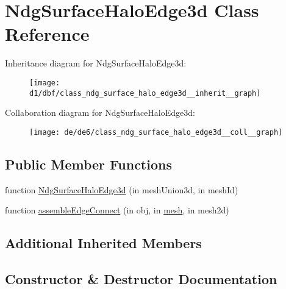 \hypertarget{class_ndg_surface_halo_edge3d}{}\section{Ndg\+Surface\+Halo\+Edge3d Class Reference}
\label{class_ndg_surface_halo_edge3d}


Inheritance diagram for Ndg\+Surface\+Halo\+Edge3d\+:
\nopagebreak
\begin{figure}[H]
\begin{center}
\leavevmode
\texttt{[image: d1/dbf/class\_ndg\_surface\_halo\_edge3d\_\_inherit\_\_graph]}
\end{center}
\end{figure}


Collaboration diagram for Ndg\+Surface\+Halo\+Edge3d\+:
\nopagebreak
\begin{figure}[H]
\begin{center}
\leavevmode
\texttt{[image: de/de6/class\_ndg\_surface\_halo\_edge3d\_\_coll\_\_graph]}
\end{center}
\end{figure}
\subsection*{Public Member Functions}
\begin{DoxyCompactItemize}
\item 
function \hyperlink{class_ndg_surface_halo_edge3d_a773d2b883ff27b786336fc5eae131855}{Ndg\+Surface\+Halo\+Edge3d} (in mesh\+Union3d, in mesh\+Id)
\item 
function \hyperlink{class_ndg_surface_halo_edge3d_afa3b659e3501ebafb4866cf33fc0bf92}{assemble\+Edge\+Connect} (in obj, in \hyperlink{class_ndg_bottom_inner_edge3d_a19345b1da21dfbe0866a8b543ecbb5d4}{mesh}, in mesh2d)
\end{DoxyCompactItemize}
\subsection*{Additional Inherited Members}


\subsection{Constructor \& Destructor Documentation}
\mbox{\label{class_ndg_surface_halo_edge3d_a773d2b883ff27b786336fc5eae131855}} 
